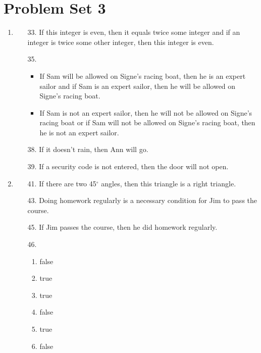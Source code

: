 \documentclass[12pt]{article}
\begin{document}
\section*{Problem Set 3}
\begin{enumerate}[label = \alph*)]
    \item
        \begin{itemize}
            \item [33.] If this integer is even, then it equals twice some
                        integer and if an integer is twice some other integer,
                        then this integer is even.
            \item [35.]
                \begin{itemize}
                    \item If Sam will be allowed on Signe’s racing boat, then he is an
                          expert sailor and if Sam is an expert sailor, then he will be allowed
                          on Signe's racing boat.
                    \item If Sam is not an expert sailor, then he will not be allowed
                          on Signe's racing boat or if Sam will not be allowed on Signe’s racing
                          boat, then he is not an expert sailor.
                \end{itemize}
            \item [38.] If it doesn't rain, then Ann will go.
            \item [39.] If a security code is not entered, then the door will not open.
        \end{itemize}
    \item 
        \begin{itemize}
            \item [41.] If there are two 45$^\circ$ angles, then this triangle is a right triangle.
            \item [43.] Doing homework regularly is a necessary condition for Jim
                        to pass the course.
            \item [45.] If Jim passes the course, then he did homework regularly.
            \item [46.]
                \begin{enumerate}[label = \alph*)]
                    \item false
                    \item true
                    \item true
                    \item false
                    \item true
                    \item false
                \end{enumerate}
        \end{itemize}
\end{enumerate}
\end{document}

